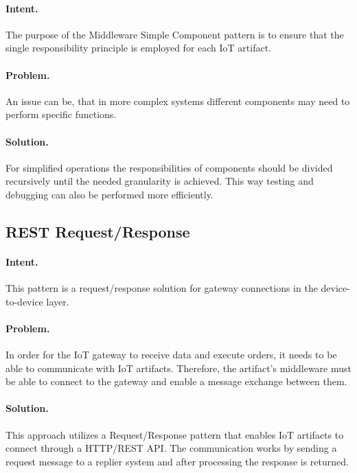 \paragraph{\textbf{Intent.}} The purpose of the Middleware Simple Component pattern is to ensure that the single responsibility principle is employed for each IoT artifact. 

\paragraph{\textbf{Problem.}} An issue can be, that in more complex systems different components may need to perform specific functions.

\paragraph{\textbf{Solution.}} For simplified operations the responsibilities of components should be divided recursively until the needed granularity is achieved. This way testing and debugging can also be performed more efficiently.


\subsection{REST Request/Response~\cite{Tkaczyk2018}} 
\label{p:rest}

\paragraph{\textbf{Intent.}} This pattern is a request/response solution for gateway connections in the device-to-device layer.

\paragraph{\textbf{Problem.}} In order for the IoT gateway to receive data and execute orders, it needs to be able to communicate with IoT artifacts. Therefore, the artifact's middleware must be able to connect to the gateway and enable a message exchange between them.

\paragraph{\textbf{Solution.}} This approach utilizes a Request/Response pattern that enables IoT artifacts to connect through a HTTP/REST API. The communication works by sending a request message to a replier system and after processing the response is returned.



